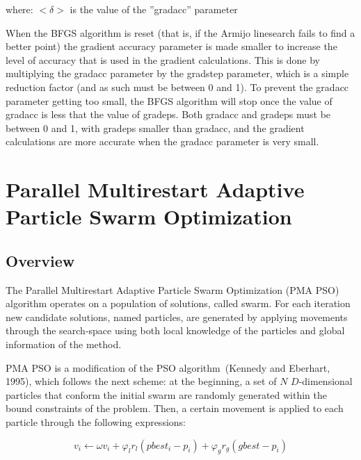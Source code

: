 \documentclass[10pt,twoside]{book}
\begin{document}
where:\newline
$<\delta>$ is the value of the ''gradacc'' parameter

\bigskip
When the BFGS algorithm is reset (that is, if the Armijo linesearch fails to find a better point) the gradient accuracy parameter is made smaller to increase the level of accuracy that is used in the gradient calculations.  This is done by multiplying the gradacc parameter by the gradstep parameter, which is a simple reduction factor (and as such must be between 0 and 1).  To prevent the gradacc parameter getting too small, the BFGS algorithm will stop once the value of gradacc is less that the value of gradeps.  Both gradacc and gradeps must be between 0 and 1, with gradeps smaller than gradacc, and the gradient calculations are more accurate when the gradacc parameter is very small.





\section{Parallel Multirestart Adaptive Particle Swarm Optimization}\label{sec:pmapso}
\subsection{Overview}\label{subsec:psoover}
The Parallel Multirestart Adaptive Particle Swarm Optimization (PMA PSO) algorithm operates on a population of solutions, called swarm. For each iteration new candidate solutions, named particles, are generated by applying movements through the search-space using both local knowledge of the particles and global information of the method. 

\bigskip

PMA PSO is a modification of the PSO algorithm~(Kennedy and Eberhart, 1995), which follows the next scheme: at the beginning, a set of $N$ $D$-dimensional particles that conform the initial swarm are randomly generated within the bound constraints of the problem. Then, a certain movement is applied to each particle through the following expressions: 

\begin{equation}v_{i} \leftarrow \omega v_{i} + \varphi_{l} r_{l} ( pbest_{i} - p_{i} )  + \varphi_{g} r_{g} ( gbest - p_{i} )  \label{eq:pso_vi} \end{equation}
\end{document}
